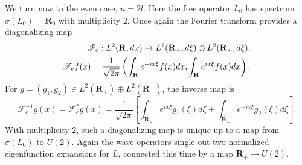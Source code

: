 \documentclass{surv-l}
\theoremstyle{plain}
\theoremstyle{definition}
\numberwithin{equation}{chapter}
\begin{document}
We turn now to the even case, $n=2l$. Here the free operator $L_{0}$ has spectrum $\sigma(L_{0})=\overline{\mathbf{R}}_{0}$ with multiplicity 2. Once again the Fourier transform provides a diagonalizing map
\begin{align}\label{eq36.21}
\mathscr{F}_{e}:L^{2}(\mathbf{R}, dx)\rightarrow L^{2}(\mathbf{R}_{+}, d\xi)\oplus L^{2}(\mathbf{R}_{+}, d\xi),\\
\mathscr{F}_{e}f(x)=\frac{1}{\sqrt{2\pi}}\left(\int_{\mathbf{R}}e^{-ix\xi}f(x)dx,\int_{\mathbf{R}}e^{ix\xi}f(x)dx\right).\notag
\end{align}
For $g =(g_{1},g_{2})\in L^{2}(\mathbf{R}_{+})\oplus L^{2}(\mathbf{R}_{+})$, the inverse map is
\begin{equation}\label{eq36.22}
\mathscr{F}_{e}^{-1}g(x) = \mathscr{F}_{e}^{*}g(x)=\frac{1}{\sqrt{2\pi}}\left[\int_{\mathbf{R}_{+}}e^{ix\xi}g_{1}(\xi)d\xi+\int_{\mathbf{R}_{+}}e^{-ix\xi}g_{2}(\xi)d\xi\right].
\end{equation}
With multiplicity 2, such a diagonalizing map is unique up to a map from $\sigma(L_{0})$ to $U(2)$. Again the wave operators single out two normalized eigenfunction expansions for $L$, connected this time by a map $\mathbf{R}_{+}\rightarrow U(2)$.
\setcounter{theorem}{22}
\end{document}
